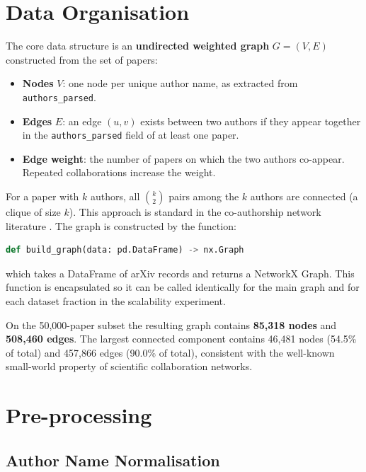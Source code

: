 \documentclass[12pt, a4paper]{article}
\begin{document}
\section{Data Organisation}

The core data structure is an \textbf{undirected weighted graph} $G = (V, E)$ constructed from the set of papers:

\begin{itemize}
  \item \textbf{Nodes} $V$: one node per unique author name, as extracted from \texttt{authors\_parsed}.
  \item \textbf{Edges} $E$: an edge $(u, v)$ exists between two authors if they appear together in the \texttt{authors\_parsed} field of at least one paper.
  \item \textbf{Edge weight}: the number of papers on which the two authors co-appear. Repeated collaborations increase the weight.
\end{itemize}

For a paper with $k$ authors, all $\binom{k}{2}$ pairs among the $k$ authors are connected (a clique of size $k$). This approach is standard in the co-authorship network literature \cite{newman2001}. The graph is constructed by the function:

\begin{lstlisting}[language=Python]
def build_graph(data: pd.DataFrame) -> nx.Graph
\end{lstlisting}

which takes a DataFrame of arXiv records and returns a NetworkX Graph. This function is encapsulated so it can be called identically for the main graph and for each dataset fraction in the scalability experiment.

On the 50{,}000-paper subset the resulting graph contains \textbf{85{,}318 nodes} and \textbf{508{,}460 edges}. The largest connected component contains 46,481 nodes (54.5\% of total) and 457{,}866 edges (90.0\% of total), consistent with the well-known small-world property of scientific collaboration networks.

\section{Pre-processing}

\subsection{Author Name Normalisation}
\end{document}
